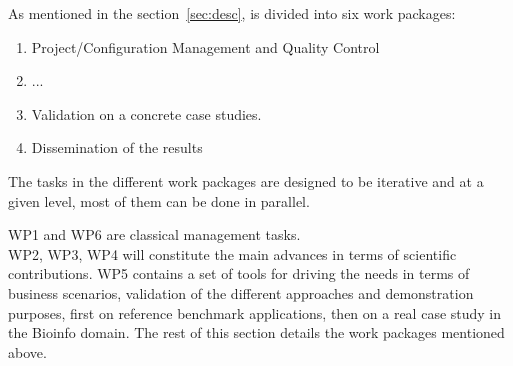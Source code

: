 % 
% 

As mentioned in the section~\ref{sec:desc}, \project is divided into
six work packages:
\begin{enumerate}
  \item Project/Configuration Management and Quality Control
  \item ...
  \item Validation on a concrete case studies.
  \item Dissemination of the results
\end{enumerate}

The tasks in the different work packages are designed to be iterative and at a
given level, most of them can be done in parallel.

WP1 and WP6 are classical management tasks.\\
WP2, WP3, WP4 will constitute the main advances in terms of scientific contributions.
WP5 contains a set of tools for driving the needs in terms of business
scenarios, validation of the different approaches and demonstration purposes,
first on reference benchmark applications, then on a real case study in the
Bioinfo domain.
The rest of this section details the work packages mentioned above.


% 
